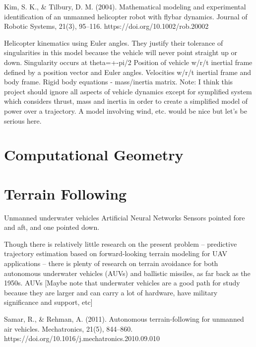 \documentclass[10pt]{article}
\begin{document}
\cite{Kim2004}
Kim, S. K., \& Tilbury, D. M. (2004). Mathematical modeling and experimental identification of an unmanned helicopter robot with flybar dynamics. Journal of Robotic Systems, 21(3), 95–116. https://doi.org/10.1002/rob.20002

Helicopter kinematics using Euler angles. They justify their tolerance of singularities in this model because the vehicle will never point straight up or down. Singularity occurs at theta=+-pi/2
Position of vehicle w/r/t inertial frame defined by a position vector and Euler angles.
Velocities w/r/t inertial frame and body frame.
Rigid body equations - mass/inertia matrix.
Note: I think this project should ignore all aspects of vehicle dynamics except for symplified system which considers thrust, mass and inertia in order to create a simplified model of power over a trajectory. A model involving wind, etc. would be nice but let’s be serious here.


\section{Computational Geometry}



\section{Terrain Following}

Unmanned underwater vehicles
Artificial Neural Networks
Sensors pointed fore and aft, and one pointed down.

Though there is relatively little research on the present problem -- predictive trajectory estimation based on forward-looking terrain modeling for UAV applications -- there is plenty of research on terrain avoidance for both autonomous underwater vehicles (AUVs) and ballistic missiles, as far back as the 1950s. 
AUVs
[Maybe note that underwater vehicles are a good path for study because they are larger and can carry a lot of hardware, have military significance and support, etc]

\cite{Samar2011}
Samar, R., \& Rehman, A. (2011). Autonomous terrain-following for unmanned air vehicles. Mechatronics, 21(5), 844–860. https://doi.org/10.1016/j.mechatronics.2010.09.010
\end{document}
